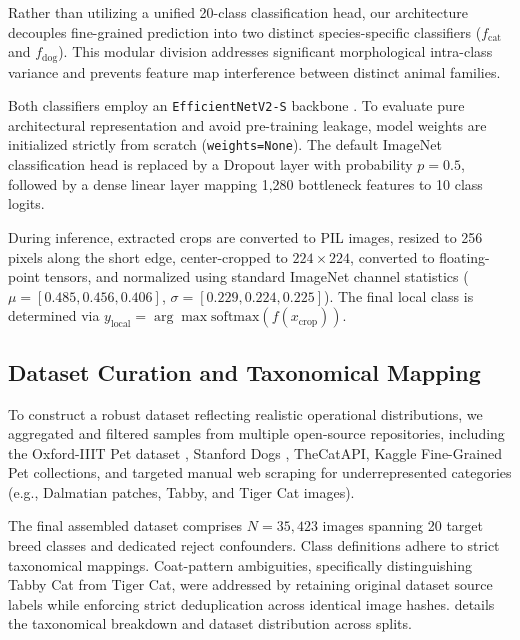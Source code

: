 Rather than utilizing a unified 20-class classification head, our architecture decouples fine-grained prediction into two distinct species-specific classifiers ($f_{\text{cat}}$ and $f_{\text{dog}}$). This modular division addresses significant morphological intra-class variance and prevents feature map interference between distinct animal families.

Both classifiers employ an \texttt{EfficientNetV2-S} backbone \cite{tan2021efficientnetv2}. To evaluate pure architectural representation and avoid pre-training leakage, model weights are initialized strictly from scratch (\texttt{weights=None}). The default ImageNet classification head is replaced by a Dropout layer with probability $p = 0.5$, followed by a dense linear layer mapping 1,280 bottleneck features to 10 class logits.

During inference, extracted crops are converted to PIL images, resized to 256 pixels along the short edge, center-cropped to $224 \times 224$, converted to floating-point tensors, and normalized using standard ImageNet channel statistics ($\mu = [0.485, 0.456, 0.406]$, $\sigma = [0.229, 0.224, 0.225]$). The final local class is determined via $y_{\text{local}} = \arg\max \text{softmax}(f(x_{\text{crop}}))$.

\subsection{Dataset Curation and Taxonomical Mapping}
\label{subsec:dataset_curation}

To construct a robust dataset reflecting realistic operational distributions, we aggregated and filtered samples from multiple open-source repositories, including the Oxford-IIIT Pet dataset \cite{parkhi2012catsdogs}, Stanford Dogs \cite{khosla2011novel}, TheCatAPI, Kaggle Fine-Grained Pet collections, and targeted manual web scraping for underrepresented categories (e.g., Dalmatian patches, Tabby, and Tiger Cat images).

The final assembled dataset comprises $N = 35,423$ images spanning 20 target breed classes and dedicated reject confounders. Class definitions adhere to strict taxonomical mappings. Coat-pattern ambiguities, specifically distinguishing Tabby Cat from Tiger Cat, were addressed by retaining original dataset source labels while enforcing strict deduplication across identical image hashes.  details the taxonomical breakdown and dataset distribution across splits.


